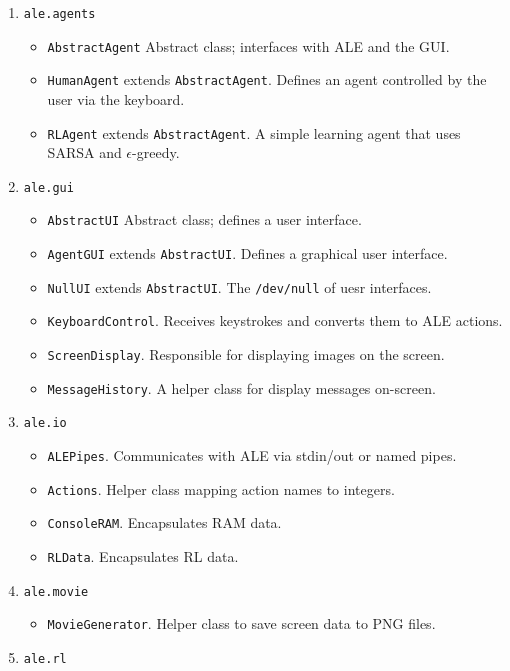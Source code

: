 \documentclass[12pt]{article}
\begin{document}
\begin{enumerate}
  \item{\verb+ale.agents+}
    \begin{itemize}
      \item{\verb+AbstractAgent+ Abstract class; interfaces with ALE and the GUI.}
      \item{\verb+HumanAgent+ extends \verb+AbstractAgent+. Defines an agent controlled by the user via the keyboard.}
      \item{\verb+RLAgent+ extends \verb+AbstractAgent+. A simple learning agent that uses SARSA and $\epsilon$-greedy.}
    \end{itemize}
  \item{\verb+ale.gui+}
    \begin{itemize}
      \item{\verb+AbstractUI+ Abstract class; defines a user interface.}
      \item{\verb+AgentGUI+ extends \verb+AbstractUI+. Defines a graphical user interface.}
      \item{\verb+NullUI+ extends \verb+AbstractUI+. The \verb+/dev/null+ of uesr interfaces.}
      \item{\verb+KeyboardControl+. Receives keystrokes and converts them to ALE actions.} 
      \item{\verb+ScreenDisplay+. Responsible for displaying images on the screen.}
      \item{\verb+MessageHistory+. A helper class for display messages on-screen.}
    \end{itemize}
  \item{\verb+ale.io+}
    \begin{itemize}
      \item{\verb+ALEPipes+. Communicates with ALE via stdin/out or named pipes.}
      \item{\verb+Actions+. Helper class mapping action names to integers.}
      \item{\verb+ConsoleRAM+. Encapsulates RAM data.} 
      \item{\verb+RLData+. Encapsulates RL data.} 
    \end{itemize}
  \item{\verb+ale.movie+}
    \begin{itemize}
      \item{\verb+MovieGenerator+. Helper class to save screen data to PNG files.}
    \end{itemize}
  \item{\verb+ale.rl+}

\end{enumerate}
\end{document}

